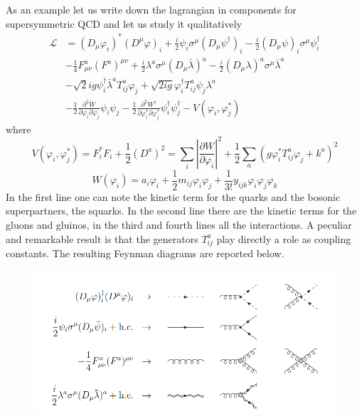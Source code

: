 \documentclass[12pt]{article}
\begin{document}
As an example let us write down the lagrangian in components for supersymmetric QCD and let us study it qualitatively
\begin{equation*}
  \begin{aligned}
      \mathcal{L} &=\left(D_{\mu} \varphi_{i}\right)^{*}\left(D^{\mu} \varphi\right)_{i}+\frac{i}{2} \psi_{i} \sigma^{\mu}\left(D_{\mu} \psi^{\dagger}\right)_{i}-\frac{i}{2}\left(D_{\mu} \psi\right)_{i} \sigma^{\mu} \psi^{\dagger}_{i}\\
      &-\frac{1}{4} F_{\mu \nu}^{a}\left(F^{a}\right)^{\mu \nu}+\frac{i}{2} \lambda^{a} \sigma^{\mu}\left(D_{\mu} \bar{\lambda}\right)^{a}-\frac{i}{2}\left(D_{\mu} \lambda\right)^{a} \sigma^{\mu} \bar{\lambda}^{a} \\
      &-\sqrt{2} i g \psi^{\dagger}_{i} \bar{\lambda}^{a} T_{i j}^{a} \varphi_{j}+\sqrt{2 i g} \varphi_{i}^{\dagger} T_{i j}^{a} \psi_{j} \lambda^{a} \\
      &-\frac{1}{2} \frac{\partial^{2} W}{\partial \varphi_{i} \partial \varphi_{j}} \psi_{i} \psi_{j}-\frac{1}{2} \frac{\partial^{2} W^{\dagger}}{\partial \varphi_{i}^{*} \partial \varphi_{j}^{*}} \psi^{\dagger}_{i} \psi^{\dagger}_{j}-V\left(\varphi_{i}, \varphi_{j}^{*}\right)
      \end{aligned}
\end{equation*}
where 
\begin{equation*}
    V\left(\varphi_{i}, \varphi_{j}^{*}\right)=F_{i}^{*} F_{i}+\frac{1}{2}\left(D^{a}\right)^{2}=\sum_{i}\left|\frac{\partial W}{\partial \varphi_{i}}\right|^{2}+\frac{1}{2} \sum_{a}\left(g \varphi_{i}^{*} T_{i j}^{a} \varphi_{j}+k^{a}\right)^{2}
\end{equation*}
\begin{equation*}
    W\left(\varphi_{i}\right)=a_{i} \varphi_{i}+\frac{1}{2} m_{i j} \varphi_{i} \varphi_{j}+\frac{1}{3 !} y_{i j k} \varphi_{i} \varphi_{j} \varphi_{k}
\end{equation*}
In the first line one can note the kinetic term for the quarks and the bosonic superpartners, the squarks. In the second line there are the kinetic terms for the gluons and gluinos, in the third and fourth lines all the interactions. A peculiar and remarkable result is that the generators $T^a_{ij}$ play directly 
a role as coupling constants. The resulting Feynman diagrams are reported below.
\begin{figure}[h]
  \centering 
  \includegraphics[scale=0.35]{sqcd_inter_2.png}
\end{figure}
\end{document}
